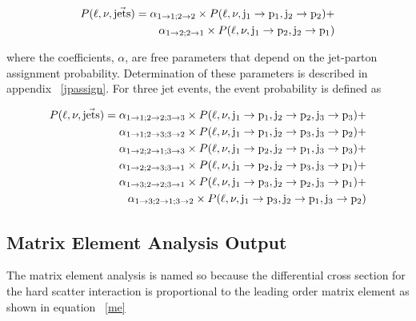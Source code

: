 \begin{eqnarray}
\label{assign}
\nonumber
P(\ell, \nu, \vec{\rm{jets}}) = \alpha_{1 \rightarrow 1;2 \rightarrow 2} \times P(\ell, \nu, \rm{j}_{1} \rightarrow p_{1}, j_{2} \rightarrow p_{2}) + \\
\alpha_{1 \rightarrow 2; 2 \rightarrow 1} \times P(\ell, \nu, \rm{j}_{1} \rightarrow p_{2}, j_{2} \rightarrow p_{1})
\end{eqnarray}

where the coefficients, $\alpha$, are free parameters that depend on the jet-parton assignment probability. Determination of these parameters is described in appendix ~\ref{jpassign}. For three jet events, the event probability is defined as

\begin{eqnarray}
\label{assign}
\nonumber
P(\ell, \nu, \vec{\rm{jets}}) = 
\alpha_{1 \rightarrow 1;2 \rightarrow 2; 3 \rightarrow 3} \times P(\ell, \nu, \rm{j}_{1} \rightarrow p_{1}, j_{2} \rightarrow p_{2}, j_{3} \rightarrow p_{3}) + \\
\nonumber
\alpha_{1 \rightarrow 1;2 \rightarrow 3; 3 \rightarrow 2} \times P(\ell, \nu, \rm{j}_{1} \rightarrow p_{1}, j_{2} \rightarrow p_{3}, j_{3} \rightarrow p_{2}) + \\
\nonumber
\alpha_{1 \rightarrow 2;2 \rightarrow 1; 3 \rightarrow 3} \times P(\ell, \nu, \rm{j}_{1} \rightarrow p_{2}, j_{2} \rightarrow p_{1}, j_{3} \rightarrow p_{3}) + \\
\nonumber
\alpha_{1 \rightarrow 2;2 \rightarrow 3; 3 \rightarrow 1} \times P(\ell, \nu, \rm{j}_{1} \rightarrow p_{2}, j_{2} \rightarrow p_{3}, j_{3} \rightarrow p_{1}) + \\
\nonumber
\alpha_{1 \rightarrow 3;2 \rightarrow 2; 3 \rightarrow 1} \times P(\ell, \nu, \rm{j}_{1} \rightarrow p_{3}, j_{2} \rightarrow p_{2}, j_{3} \rightarrow p_{1}) + \\
\alpha_{1 \rightarrow 3;2 \rightarrow 1; 3 \rightarrow 2} \times P(\ell, \nu, \rm{j}_{1} \rightarrow p_{3}, j_{2} \rightarrow p_{1}, j_{3} \rightarrow p_{2})
\end{eqnarray}

\subsection{Matrix Element Analysis Output}
The matrix element analysis is named so because the differential cross section for the hard scatter interaction is proportional to the leading order matrix element as shown in equation ~\ref{me}

